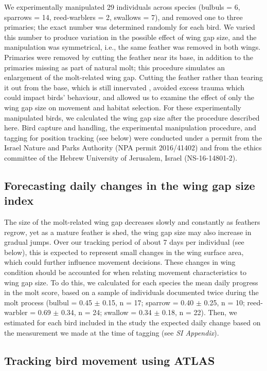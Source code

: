 \begin{refsection}
We experimentally manipulated 29 individuals across species {(bulbuls = 6, sparrows = 14, reed-warblers = 2, swallows = 7)}, and removed one to three primaries; the exact number was determined randomly for each bird.
We varied this number to produce variation in the possible effect of wing gap size, and the manipulation was symmetrical, i.e., the same feather was removed in both wings.
Primaries were removed by cutting the feather near its base, in addition to the primaries missing as part of natural molt; this procedure simulates an enlargement of the molt-related wing gap.
Cutting the feather rather than tearing it out from the base, which is still innervated \cite{jenni2020}, avoided excess trauma which could impact birds' behaviour, and allowed us to examine the effect of only the wing gap size on movement and habitat selection.
For these experimentally manipulated birds, we calculated the wing gap size after the procedure described here.
Bird capture and handling, the experimental manipulation procedure, and tagging for position tracking (see below) were conducted under a permit from the Israel Nature and Parks Authority (NPA permit 2016/41402) and from the ethics committee of the Hebrew University of Jerusalem, Israel (NS-16-14801-2).

\subsection{Forecasting daily changes in the wing gap size index}

The size of the molt-related wing gap decreases slowly and constantly as feathers regrow, yet as a mature feather is shed, the wing gap size may also increase in gradual jumps.
Over our tracking period of about 7 days per individual (see below), this is expected to represent small changes in the wing surface area, which could further influence movement decisions.
These changes in wing condition should be accounted for when relating movement characteristics to wing gap size.
To do this, we calculated for each species the mean daily progress in the molt score, based on a sample of individuals documented twice during the molt process (bulbul = 0.45 $\pm$ 0.15, n = 17; sparrow = 0.40 $\pm$ 0.25, n = 10; reed-warbler = 0.69 $\pm$ 0.34, n = 24; swallow = 0.34 $\pm$ 0.18, n = 22). 
Then, we estimated for each bird included in the study the expected daily change based on the measurement we made at the time of tagging (see \textit{SI Appendix}).

\subsection{Tracking bird movement using ATLAS}


\end{refsection}
